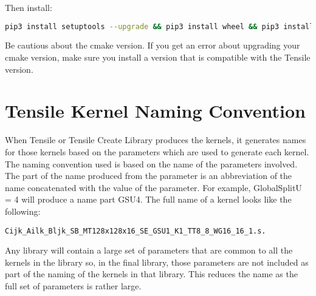 \documentclass[]{article}
\begin{document}
\noindent Then install:

\begin{lstlisting}[language=bash,breaklines=true]
pip3 install setuptools --upgrade && pip3 install wheel && pip3 install pyyaml msgpack openpyxl pandas
\end{lstlisting}
\noindent Be cautious about the cmake version. If you get an error about upgrading your cmake version, make sure you install a version that is compatible with the Tensile version.




\section{Tensile Kernel Naming Convention}
\label{sec:appendixC}

When Tensile or Tensile Create Library produces the kernels, it generates names for those kernels based on the parameters which are used to generate each kernel. The naming convention used is based on the name of the parameters involved. The part of the name produced from the parameter is an abbreviation of the name concatenated with the value of the parameter. For example, GlobalSplitU = 4 will produce a name part GSU4. The full name of a kernel looks like the following:

\begin{lstlisting}
Cijk_Ailk_Bljk_SB_MT128x128x16_SE_GSU1_K1_TT8_8_WG16_16_1.s.
\end{lstlisting}

Any library will contain a large set of parameters that are common to all the kernels in the library so, in the final library, those parameters are not included as part of the naming of the kernels in that library. This reduces the name as the full set of parameters is rather large.
\end{document}

